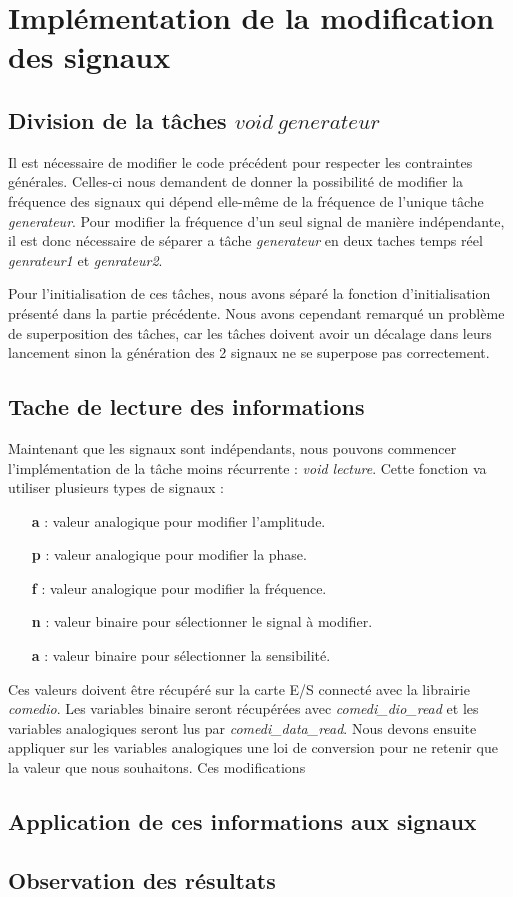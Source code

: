 \section{Implémentation de la modification des signaux}

\subsection{Division de la tâches $void\ generateur$}	
Il est nécessaire de modifier le code précédent pour respecter les contraintes générales. Celles-ci nous demandent de donner la possibilité de modifier la fréquence des signaux qui dépend elle-même de la fréquence de l'unique tâche \emph{generateur}. Pour modifier la fréquence d'un seul signal de manière indépendante, il est donc nécessaire de séparer a tâche \emph{generateur} en deux taches temps réel \emph{genrateur1} et \emph{genrateur2}. 

Pour l'initialisation de ces tâches, nous avons séparé la fonction d'initialisation présenté dans la partie précédente. Nous avons cependant remarqué un problème de superposition des tâches, car les tâches doivent avoir un décalage dans leurs lancement sinon la génération des 2 signaux ne se superpose pas correctement. 
\subsection{Tache de lecture des informations}
Maintenant que les signaux sont indépendants, nous pouvons commencer l'implémentation de la tâche moins récurrente : \emph{void lecture}. Cette fonction va utiliser plusieurs types de signaux : 
\begin{itemize}
\item[\textbf{a} :]valeur analogique pour modifier l'amplitude.
\item[\textbf{p} :]valeur analogique pour modifier la phase.
\item[\textbf{f} :]valeur analogique pour modifier la fréquence.
\item[\textbf{n} :]valeur binaire pour sélectionner le signal à modifier.
\item[\textbf{a} :]valeur binaire pour sélectionner la sensibilité.
\end{itemize}
Ces valeurs doivent être récupéré sur la carte E/S connecté avec la librairie \emph{comedio}. Les variables binaire seront récupérées avec \emph{comedi\_dio\_read} et les variables analogiques seront lus par \emph{comedi\_data\_read}. Nous devons ensuite appliquer sur les variables analogiques une loi de conversion pour ne retenir que la valeur que nous souhaitons. Ces modifications 
\subsection{Application de ces informations aux signaux}


\subsection{Observation des résultats}